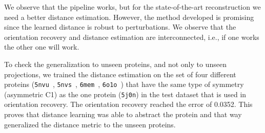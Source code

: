 We observe that the pipeline works, but for the state-of-the-art reconstruction we need a better distance estimation.
However, the method developed is promising since the learned distance is robust to perturbations.
We observe that the orientation recovery and distance estimation are interconnected, i.e., if one works the other one will work.

To check the generalization to unseen proteins, and not only to  unseen projections, we trained the distance estimation on the set of four different proteins (\texttt{5nvu}~\cite{5nvu_pdb}, \texttt{5nvs}~\cite{5nvs_pdb}, \texttt{6mem}~\cite{6mem_pdb}, \texttt{6o1o}~\cite{6o1o_pdb}) that have the same type of symmetry (asymmetric  C1) as the one protein (\texttt{5j0n}) in the test dataset that is used in orientation recovery.
The orientation recovery reached the error of 0.0352.
This proves that distance learning was able to abstract the protein and that way generalized the distance metric to the unseen proteins.

